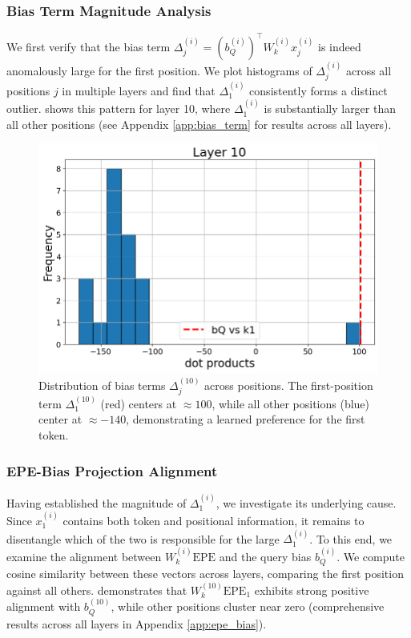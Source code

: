 \documentclass[11pt]{article}
\newif\ifBacklogcomments
\newcommand{\Backlog}[1]{\ifBacklogcomments\textcolor{blue}{[Backlog: #1]}\fi}
\begin{document}
\subsubsection{Bias Term Magnitude Analysis}
\label{sec:delta_analysis}
We first verify that the bias term $\Delta_j^{(i)} = (b_Q^{(i)})^\top W_k^{(i)} x_j^{(i)}$ is indeed anomalously large for the first position. We plot histograms of $\Delta_j^{(i)}$ across all positions $j$ in multiple layers and find that $\Delta_1^{(i)}$ consistently forms a distinct outlier.  shows this pattern for layer 10, where $\Delta_1^{(i)}$ is substantially larger than all other positions (see Appendix \ref{app:bias_term} for results across all layers).

\begin{figure}[t]
  \includegraphics[width=\columnwidth]{figures/obs1_layer10.png}
  \caption{Distribution of bias terms $\Delta_j^{(10)}$ across positions. The first-position term $\Delta_1^{(10)}$ (red) centers at $\approx 100$, while all other positions (blue) center at $\approx -140$, demonstrating a learned preference for the first token.}
  \label{fig:obs1_layer10}
\end{figure}

\subsubsection{EPE-Bias Projection Alignment}
\label{sec:epe_alignment}
Having established the magnitude of $\Delta_1^{(i)}$, we investigate its underlying cause. Since $x_1^{(i)}$ contains both token and positional information, it remains to disentangle which of the two is responsible for the large $\Delta_1^{(i)}$. To this end, we examine the alignment between $W_k^{(i)}\mathrm{EPE}$ and the query bias $b_Q^{(i)}$. We compute cosine similarity between these vectors across layers, comparing the first position against all others.  demonstrates that $W_k^{(10)}\mathrm{EPE}_1$ exhibits strong positive alignment with $b_Q^{(10)}$, while other positions cluster near zero (comprehensive results across all layers in Appendix \ref{app:epe_bias}).\Backlog{If we can also do that for $x_1^{(i)}-\mathrm{EPE}_1$ and show that this isn't aligned that would be great for this paragraph (we can put it in the appendix and just write it casually. This is not top priority at all.)}
\end{document}
